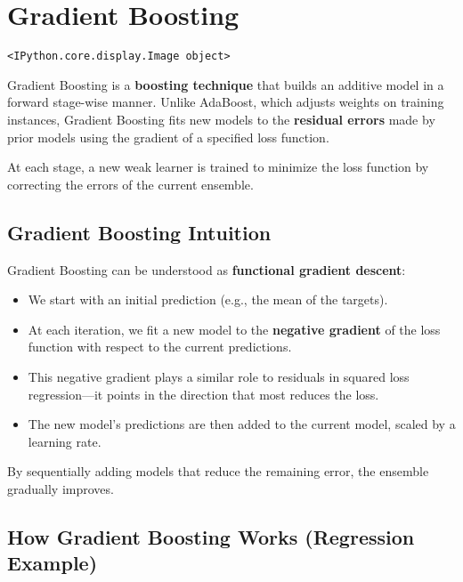 \documentclass[
  letterpaper,
  DIV=11,
  numbers=noendperiod]{scrreprt}
\providecommand{\tightlist}{%
  \setlength{\itemsep}{0pt}\setlength{\parskip}{0pt}}\usepackage{longtable,booktabs,array}
\begin{document}
\chapter{Gradient Boosting}\label{gradient-boosting}

\begin{verbatim}
<IPython.core.display.Image object>
\end{verbatim}

Gradient Boosting is a \textbf{boosting technique} that builds an
additive model in a forward stage-wise manner. Unlike AdaBoost, which
adjusts weights on training instances, Gradient Boosting fits new models
to the \textbf{residual errors} made by prior models using the gradient
of a specified loss function.

At each stage, a new weak learner is trained to minimize the loss
function by correcting the errors of the current ensemble.

\section{Gradient Boosting Intuition}\label{gradient-boosting-intuition}

Gradient Boosting can be understood as \textbf{functional gradient
descent}:

\begin{itemize}
\tightlist
\item
  We start with an initial prediction (e.g., the mean of the targets).
\item
  At each iteration, we fit a new model to the \textbf{negative
  gradient} of the loss function with respect to the current
  predictions.
\item
  This negative gradient plays a similar role to residuals in squared
  loss regression---it points in the direction that most reduces the
  loss.
\item
  The new model's predictions are then added to the current model,
  scaled by a learning rate.
\end{itemize}

By sequentially adding models that reduce the remaining error, the
ensemble gradually improves.

\section{How Gradient Boosting Works (Regression
Example)}\label{how-gradient-boosting-works-regression-example}
\end{document}

